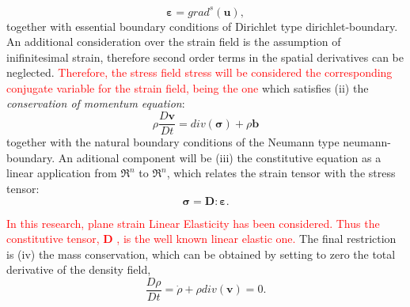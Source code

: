 \documentclass[preprint,12pt,a4paper]{elsarticle}
\newcommand{\vect}[1]{
  \ensuremath{\mathbf{{#1}}}
}
\newcommand{\tens}[1]{
  \ensuremath{\mathbf{{#1}}}
}
\newcommand{\Div}[1]{
  \ensuremath{div({#1})}
}
\newcommand\GradS[1]{grad^s({#1})}
\newcommand{\PNA}[1]{
  \textcolor{red}{{#1}}
}
\begin{document}
\begin{equation}
  \label{eq:Compatibility-equation}
  \tens{\varepsilon} = \GradS{\vect{u}},
\end{equation}
together with essential boundary conditions of Dirichlet type \gls{dirichlet-boundary}. An additional consideration over the strain field is
the assumption of inifinitesimal strain, therefore second order terms
in the spatial derivatives can be neglected.\PNA{Therefore, the stress field \gls{stress} will be considered the corresponding conjugate variable for the strain field, being the one} which satisfies (ii) the \textit{conservation of
  momentum equation}:
\begin{equation}
  \label{eq:Balance-momentum}
\rho \frac{D\vect{v}}{Dt} = \Div{\tens{\sigma}} + \rho \vect{b}
\end{equation}
together with the natural boundary conditions of the Neumann type \gls{neumann-boundary}.  An aditional component will be (iii) the constitutive equation as a linear
application from $\Re^n$ to $\Re^n$, which relates the
strain tensor with the stress tensor:
\begin{equation}
  \label{eq:Constitutive-equation}
\tens{\sigma} = \tens{D} \colon \tens{\varepsilon}.
\end{equation}
\PNA{In this research, plane strain Linear Elasticity has been considered. Thus the constitutive tensor, \tens{D}, is the well known linear elastic one.} The final restriction is (iv) the mass conservation, which can be obtained by
setting to zero the total derivative of the density field,
\begin{equation}
  \label{eq:Rho-material-derivative}
  \frac{D \rho}{D t} = \dot{\rho} + \rho \Div{\vect{v}} = 0.
\end{equation}
\end{document}
